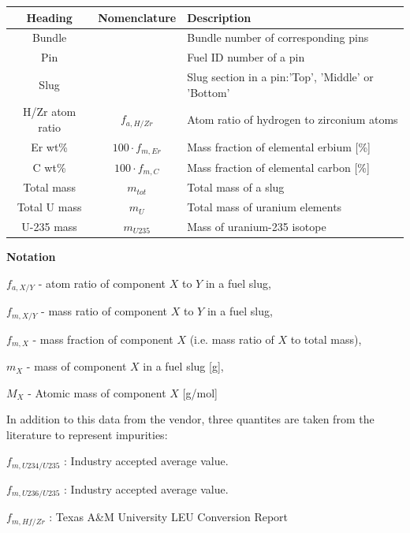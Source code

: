 \documentclass{UWNR_modeling}
\begin{document}
\begin{tabular}{|c|c|l|}
\hline
Heading & Nomenclature & Description \\ \hline
Bundle & & Bundle number of corresponding pins\\
Pin & & Fuel ID number of a pin\\
Slug & & Slug section in a pin:'Top', 'Middle' or 'Bottom'\\
H/Zr atom ratio & $f_{a,H/Zr}$ & Atom ratio of hydrogen to zirconium atoms\\
Er wt\% & $100 \cdot f_{m,Er}$ & Mass fraction of elemental erbium [\%]\\
C wt\% & $100 \cdot f_{m,C}$ & Mass fraction of elemental carbon [\%]\\
Total mass & $m_{tot}$ & Total mass of a slug\\
Total U mass & $m_{U}$ & Total mass of uranium elements\\
U-235 mass & $m_{U235}$ & Mass of uranium-235 isotope\\ \hline
\end{tabular}

\textbf{Notation}\vspace{-0.9\parskip}
\begin{myitemize}
\item $f_{a,X/Y}$ - atom ratio of component $X$ to $Y$ in a fuel slug,
\item $f_{m,X/Y}$ - mass ratio of component $X$ to $Y$ in a fuel slug,
\item $f_{m,X}$ - mass fraction of component $X$ (i.e. mass ratio of $X$ to total mass),
\item $m_X$ - mass of component $X$ in a fuel slug [g],
\item $M_X$ - Atomic mass of component $X$ [g/mol]
\end{myitemize}

In addition to this data from the vendor, three quantites are taken from the
literature to represent impurities:
\begin{myitemize}
\item $f_{m,U234/U235}$ : Industry accepted average value.
\item $f_{m,U236/U235}$ : Industry accepted average value.
\item $f_{m,Hf/Zr}$  : Texas A\&M University LEU Conversion Report \cite{xx}
\end{myitemize}
\end{document}
